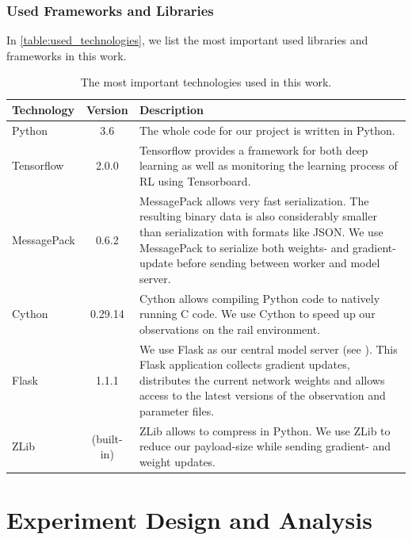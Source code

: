 \subsection*{Used Frameworks and Libraries}\label{framework_and_libraries}
In \autoref{table:used_technologies}, we list the most important used libraries and frameworks in this work.
\begin{table}[H]
	\centering
	\begin{tabularx}{\textwidth}{ |l|c|X| } 
		\hline
		\textbf{Technology}	& \textbf{Version} & \textbf{Description}\\
		\hline
		Python & 3.6 & The whole code for our project is written in Python.\\
		\hline
		Tensorflow & 2.0.0 & Tensorflow provides a framework for both deep learning as well as monitoring the learning process of RL using Tensorboard.\\
		\hline
		MessagePack & 0.6.2 & MessagePack allows very fast serialization. The resulting binary data is also considerably smaller than serialization with formats like JSON. We use MessagePack to serialize both weights- and gradient-update before sending between worker and model server.\\
		\hline
		Cython & 0.29.14 & Cython allows compiling Python code to natively running C code. We use Cython to speed up our observations on the rail environment.\\
		\hline
		Flask & 1.1.1 & We use Flask as our central model server (see \nameref{dist_architecture}). This Flask application collects gradient updates, distributes the current network weights and allows access to the latest versions of the observation and parameter files.\\
		\hline
		ZLib & (built-in) & ZLib allows to compress in Python. We use ZLib to reduce our payload-size while sending gradient- and weight updates.\\
		\hline
	\end{tabularx}
	\caption{The most important technologies used in this work.}
	\label{table:used_technologies}
\end{table}
\chapter{Experiment Design and Analysis}
\label{chap.experiment}

